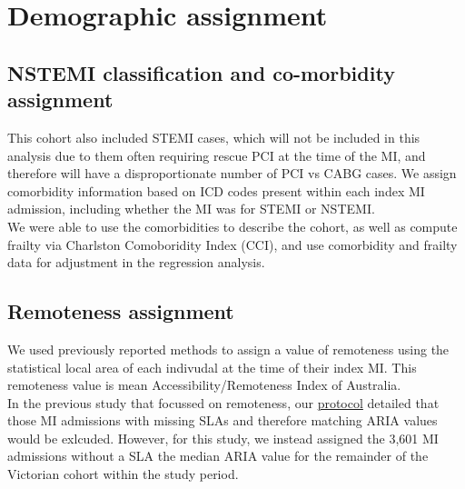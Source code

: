 \documentclass[11pt]{article}
\begin{document}
\color{black}
\pagebreak
\section{Demographic assignment}
\subsection{NSTEMI classification and co-morbidity assignment}
This cohort also included STEMI cases, which will not be included in this analysis due to them often requiring rescue PCI at the time of the MI, and therefore will have a disproportionate number of PCI vs CABG cases.\cite{takeji2021} We assign comorbidity information based on ICD codes present within each index MI admission, including whether the MI was for STEMI or NSTEMI. \\
We were able to use the comorbidities to describe the cohort, as well as compute frailty via Charlston Comoboridity Index (CCI)\cite{icdadmin}, and use comorbidity and frailty data for adjustment in the regression analysis. \\
\color{violet}
\begin{stlog}\end{stlog}
\color{black}
\pagebreak
\subsection{Remoteness assignment}
We used previously reported methods to assign a value of remoteness using the statistical local area of each indivudal at the time of their index MI. This remoteness value is mean Accessibility/Remoteness Index of Australia.\cite{aihwrural} \\
In the previous study that focussed on remoteness, our \color{blue} \href{https://github.com/cardiopharmnerd/medsremote}{protocol} \color{black} detailed that those MI admissions with missing SLAs and therefore matching ARIA values would be exlcuded. However, for this study, we instead assigned the 3,601 MI admissions without a SLA the median ARIA value for the remainder of the Victorian cohort within the study period. 
\color{violet}
\begin{stlog}\end{stlog}
\color{black}
\pagebreak
\end{document}
